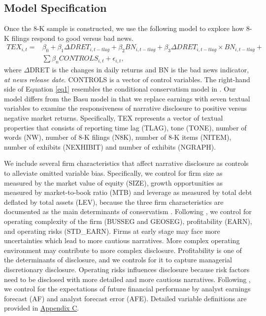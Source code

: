 \documentclass[letterpaper,12pt]{article}
\begin{document}
\begin{spacing}{1.5}
\subsection{Model Specification} \label{sec3.4}
\noindent Once the 8-K sample is constructed, we use the following model to explore how 8-K filings respond to good versus bad news.
\begin{equation}
\begin{aligned}
\label{eq1}
TEX_{i,t}=
&\beta_0+\beta_1\Delta DRET_{i,t-tlag}+\beta_2BN_{i,t-tlag}+\beta_3\Delta DRET_{i,t-tlag}\times BN_{i,t-tlag}+\\
&\sum\beta_nCONTROLS_{i,t}+\epsilon_{i,t},
\end{aligned}
\end{equation}
where $\Delta$DRET is the changes in daily returns and BN is the bad news indicator, \textit{at news release date}. CONTROLS is a vector of control variables. The right-hand side of Equation \eqref{eq1} resembles the conditional conservatism model in . Our model differs from the Basu model in that we replace earnings with seven textual variables to examine the responsiveness of narrative disclosure to positive versus negative market returns. Specifically, TEX represents a vector of textual properties that consists of reporting time lag (TLAG), tone (TONE), number of words (NW), number of 8-K filings (N8K), number of 8-K items (NITEM), number of exhibits (NEXHIBIT) and number of exhibits (NGRAPH). 

We include several firm characteristics that affect narrative disclosure as controls to alleviate omitted variable bias. Specifically, we control for firm size as measured by the market value of equity (SIZE), growth opportunities as measured by market-to-book ratio (MTB) and leverage as measured by total debt deflated by total assets (LEV), because the three firm characteristics are documented as the main determinants of conservatism \cite{wattsConservatismAccountingPart2003, qiangEffectsContractingLitigation2007, khanEstimationEmpiricalProperties2009, garcialaraEconomicDeterminantsConditional2009}. Following , we control for operating complexity of the firm (BUSSEG and GEOSEG), profitability (EARN), and operating risks (STD\_EARN). Firms at early stage may face more uncertainties which lead to more cautious narratives. More complex operating environment may contribute to more complex disclosure. Profitability is one of the determinants of disclosure, and we controls for it to capture managerial discretionary disclosure. Operating risks influences disclosure because risk factors need to be disclosed with more detailed and more cautious narratives. Following , we control for the expectations of future financial performane by analyst earnings forecast (AF) and analyst forecast error (AFE). Detailed variable definitions are provided in \hyperref[appc]{Appendix C}.


\end{spacing}
\end{document}

